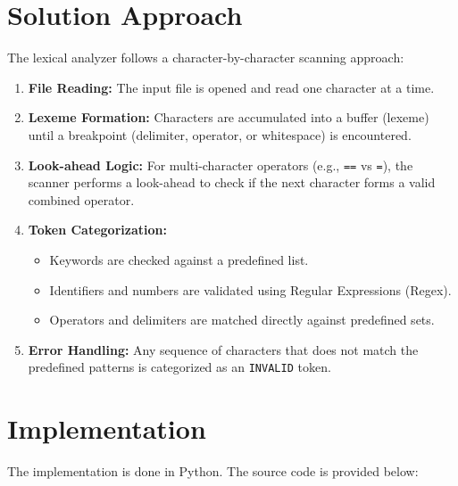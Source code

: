 \documentclass{article}
\begin{document}
\section{Solution Approach}
The lexical analyzer follows a character-by-character scanning approach:
\begin{enumerate}
    \item \textbf{File Reading:} The input file is opened and read one character at a time.
    \item \textbf{Lexeme Formation:} Characters are accumulated into a buffer (lexeme) until a breakpoint (delimiter, operator, or whitespace) is encountered.
    \item \textbf{Look-ahead Logic:} For multi-character operators (e.g., \texttt{==} vs \texttt{=}), the scanner performs a look-ahead to check if the next character forms a valid combined operator.
    \item \textbf{Token Categorization:} 
    \begin{itemize}
        \item Keywords are checked against a predefined list.
        \item Identifiers and numbers are validated using Regular Expressions (Regex).
        \item Operators and delimiters are matched directly against predefined sets.
    \end{itemize}
    \item \textbf{Error Handling:} Any sequence of characters that does not match the predefined patterns is categorized as an \texttt{INVALID} token.
\end{enumerate}

\section{Implementation}
The implementation is done in Python. The source code is provided below:
\end{document}
